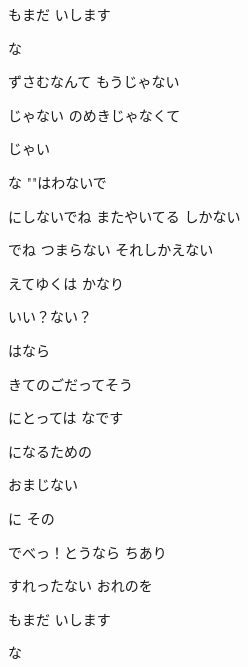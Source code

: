 \documentclass[a4paper,tate,twocolumn,12pt]{ltjtarticle}
\begin{document}
\begin{flushleft}
\begin{minipage}{\linewidth}
もまだ いします

な 

ずさむなんて もうじゃない

じゃない のめきじゃなくて

じゃい

な ""はわないで

にしないでね またやいてる しかない

でね つまらない それしかえない
\end{minipage}

\vspace{2em}

\noindent\begin{minipage}{\linewidth}
えてゆくは かなり

いい？ない？

はなら

きてのごだってそう

にとっては なです

 になるための

おまじない

に その

でべっ！とうなら ちあり
\end{minipage}

\vspace{2em}

\noindent\begin{minipage}{\linewidth}
すれったない おれのを

もまだ いします

な


\end{minipage}
\end{flushleft}
\end{document}
